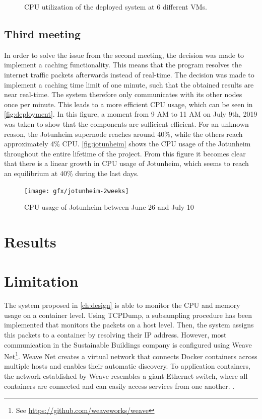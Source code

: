 \begin{figure}
    \caption{CPU utilization of the deployed system at 6 different VMs.}
    \label{fig:deployment}
\end{figure}

\subsection{Third meeting}
In order to solve the issue from the second meeting, the decision was made to implement a caching functionality. This means that the program resolves the internet traffic packets afterwards instead of real-time. The decision was made to implement a caching time limit of one minute, such that the obtained results are near real-time. The system therefore only communicates with its other nodes once per minute. This leads to a more efficient CPU usage, which can be seen in \autoref{fig:deployment}. In this figure, a moment from 9 AM to 11 AM on July 9th, 2019 was taken to show that the components are sufficient efficient. For an unknown reason, the Jotunheim supernode reaches around 40\%, while the others reach approximately 4\% CPU. \autoref{fig:jotunheim} shows the CPU usage of the Jotunheim throughout the entire lifetime of the project. From this figure it becomes clear that there is a linear growth in CPU usage of Jotunheim, which seems to reach an equilibrium at 40\% during the last days. 

\begin{figure}
    \centering
    \texttt{[image: gfx/jotunheim-2weeks]}
    \caption{CPU usage of Jotunheim between June 26 and July 10}
    \label{fig:jotunheim}
\end{figure}

\section{Results}



\section{Limitation}
The system proposed in \autoref{ch:design} is able to monitor the CPU and memory usage on a container level. Using TCPDump, a subsampling procedure has been implemented that monitors the packets on a host level. Then, the system assigns this packets to a container by resolving their IP address. However, most communication in the Sustainable Buildings company is configured using Weave Net\footnote{See \url{https://github.com/weaveworks/weave}}. Weave Net creates a virtual network that connects Docker containers across multiple hosts and enables their automatic discovery. To application containers, the network established by Weave resembles a giant Ethernet switch, where all containers are connected and can easily access services from one another. \cite{weave}.


